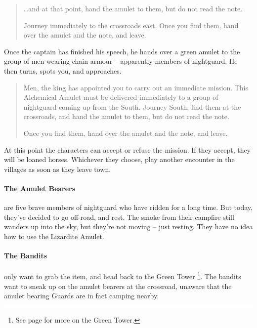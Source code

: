 \begin{multicols}{2}
\begin{boxtext}
\begin{quotation}
		\ldots and at that point, hand the amulet to them, but do not read the note.

		Journey immediately to the crossroads east.
		Once you find them, hand over the amulet and the note, and leave.

	\end{quotation}

	Once the captain has finished his speech, he hands over a green amulet to the group of men wearing chain armour -- apparently members of \gls{nightguard}.
	He then turns, spots you, and approaches.

	\begin{quotation}

		Men, the king has appointed you to carry out an immediate mission.
		This Alchemical Amulet must be delivered immediately to a group of \gls{nightguard} coming up from the South.
		Journey South, find them at the crossroads, and hand the amulet to them, but do not read the note.

		Once you find them, hand over the amulet and the note, and leave.

	\end{quotation}

\end{boxtext}

At this point the characters can accept or refuse the mission.
If they accept, they will be loaned horses.
Whichever they choose, play another encounter in the villages as soon as they leave \gls{town}.

\paragraph{The Amulet Bearers} are five brave members of \gls{nightguard} who have ridden for a long time.
But today, they've decided to go off-road, and rest.
The smoke from their campfire still wanders up into the sky, but they're not moving -- just resting.
They have no idea how to use the Lizardite Amulet.


\paragraph{The Bandits} only want to grab the item, and head back to the Green Tower \footnote{See page \pageref{green_tower} for more on the Green Tower.}.
The bandits want to sneak up on the amulet bearers at the crossroad, unaware that the amulet bearing Guards are in fact camping nearby.


\end{multicols}
